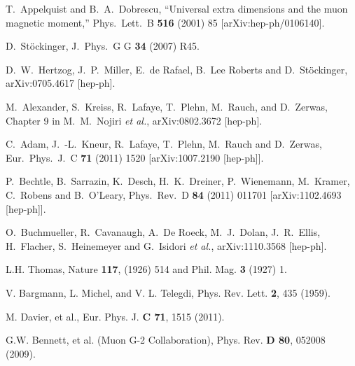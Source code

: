 \begin{thebibliography}{99}
 T.~Appelquist and B.~A.~Dobrescu, ``Universal extra
dimensions and the muon magnetic moment,'' Phys.\ Lett.\ B
\textbf{516}
(2001) 85 [arXiv:hep-ph/0106140]. %

 D.\ St\"ockinger,
  J.\ Phys.\ G G {\bf 34} (2007) R45.

 D.~W.~Hertzog, J.~P.~Miller, E.~de Rafael, B.~Lee
Roberts and D.~St\"ockinger,
arXiv:0705.4617 [hep-ph]. %

 M.~Alexander, S.~Kreiss, R.~Lafaye, T.~Plehn,
M.~Rauch, and D.~Zerwas, Chapter 9 in M.~M.~Nojiri \textit{et al.},
arXiv:0802.3672 [hep-ph]. %

  C.~Adam, J.~-L.~Kneur, R.~Lafaye, T.~Plehn, M.~Rauch and D.~Zerwas,
  Eur.\ Phys.\ J.\ C {\bf 71} (2011) 1520
  [arXiv:1007.2190 [hep-ph]].

  P.~Bechtle, B.~Sarrazin, K.~Desch, H.~K.~Dreiner, P.~Wienemann, M.~Kramer, C.~Robens and B.~O'Leary,
  Phys.\ Rev.\ D {\bf 84} (2011) 011701
  [arXiv:1102.4693 [hep-ph]].

  O.~Buchmueller, R.~Cavanaugh, A.~De Roeck, M.~J.~Dolan, J.~R.~Ellis, H.~Flacher, S.~Heinemeyer and G.~Isidori {\it et al.},
  arXiv:1110.3568 [hep-ph].



 L.H. Thomas, Nature {\bf 117}, (1926) 514 and
Phil. Mag. {\bf 3} (1927) 1.

 V. Bargmann, L.
Michel, and V. L. Telegdi, Phys. Rev. Lett. {\bf 2}, 435 (1959).

M. Davier, et al., Eur. Phys. J. {\bf C 71}, 1515 (2011).

 G.W. Bennett, et al. (Muon G-2 Collaboration),
 Phys. Rev. {\bf D 80}, 052008 (2009).





\end{thebibliography}
